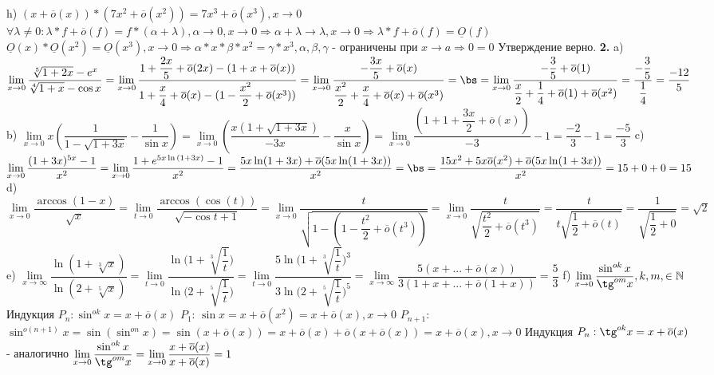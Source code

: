 \documentclass[11pt]{article}
\begin{document}
	h) $(x + \overline{o}(x)) * (7x^2 + \overline{o}(x^2)) = 7x^3 + \overline{o}(x^3), x \to 0$ \sspace
	$\forall \lambda \neq 0: \lambda * f + \overline{o}(f) = f * (\alpha  + \lambda), \alpha \to 0,  x \to 0 \Rightarrow \alpha + \lambda \to \lambda, x \to 0 \Rightarrow \lambda * f + \overline{o}(f) = \underline{O}(f)$ \sspace
	$\underline{O}(x) * \underline{O}(x ^ 2) = \underline{O}(x ^ 3), x \to 0 \Rightarrow \alpha * x  * \beta * x ^ 2 = \gamma * x ^ 3, \alpha, \beta, \gamma$ - ограничены при $x \to a \Rightarrow 0 = 0$ Утверждение верно. \sspace
	\textbf{2.} \sspace
	a) $\lim\limits_{x\to 0} \dfrac{\sqrt[5]{1 + 2x} - e^x}{\sqrt[4]{1 + x} - \cos x} = \lim\limits_{x\to 0} \dfrac{1 + \dfrac{2x}{5} + \overline{o}(2x) - (1  + x + \overline{o}(x))}{1 + \dfrac{x}{4} + \overline{o}(x) - (1 - \dfrac{x^2}{2} + \overline{o}(x ^ 3))} = \lim\limits_{x \to 0} \dfrac{-\dfrac{3x}{5} + \overline{o}(x)}{\dfrac{x^2}{2} + \dfrac{x}{4} + \overline{o}(x) + \overline{o}(x^3)} = \bs = \lim\limits_{x\to 0} \dfrac{-\dfrac{3}{5} + \overline{o}(1)}{\dfrac{x}{2} + \dfrac{1}{4} + \overline{o}(1) + \overline{o}(x^2)} = \dfrac{-\dfrac{3}{5}}{\dfrac{1}{4}} = \dfrac{-12}{5}$ \bs
	b) $\lim\limits_{x\to 0} x(\dfrac{1}{1 - \sqrt{1 + 3x}} - \dfrac{1}{\sin x}) = \lim\limits_{x\to 0} (\dfrac{x(1 + \sqrt{1 + 3x})}{-3x} - \dfrac{x}{\sin x}) = \lim\limits_{x\to 0} \dfrac{(1 + 1  + \dfrac{3x}{2} + \overline{o}(x))}{-3} - 1 = \dfrac{-2}{3} - 1 = \dfrac{-5}{3}$ \sspace
	c) $\lim\limits_{x\to 0} \dfrac{(1 + 3x) ^ {5x} - 1}{x^2} = \lim\limits_{x\to 0} \dfrac{1 + e^{5x\ln{(1 + 3x)}} - 1}{x ^ 2} = \dfrac{5x\ln(1 + 3x)  + \overline{o}(5x\ln(1 + 3x))}{x^2} = \bs = \dfrac{15x^2 + 5x\overline{o}(x^2)  + \overline{o}(5x\ln(1 + 3x))}{x^2} = 15 + 0 + 0 =15$ \sspace
	d)  $\lim\limits_{x\to 0} \dfrac{\arccos {(1 - x)}}{\sqrt{x}} = \lim\limits_{t\to 0} \dfrac{\arccos(\cos(t))}{\sqrt{-\cos t+1}} = \lim\limits_{x\to 0} \dfrac{t}{\sqrt{1 - (1 - \dfrac{t^2}{2} + \overline{o}(t^3))}} = \lim\limits_{x\to 0} \dfrac{t}{\sqrt{\dfrac{t^2}{2} + \overline{o}(t^3)}} = \dfrac{t}{t\sqrt{\dfrac{1}{2} + \overline{o}(t)}} = \dfrac{1}{\sqrt{\dfrac{1}{2} + 0}} = \sqrt{2}$ \sspace
	e) $\lim\limits_{x\to \infty} \dfrac{\ln(1  + \sqrt[3]{x})}{\ln(2 + \sqrt[5]{x})} = \lim\limits_{t \to 0} \dfrac{\ln\bigg(1  + \sqrt[3]{\dfrac{1}{t}}\bigg)}{\ln\bigg(2 + \sqrt[5]{\dfrac{1}{t}}\bigg)} = \lim\limits_{t\to 0} \dfrac{5\ln\bigg(1 + \sqrt[3]{\dfrac{1}{t}}\bigg)^3}{3\ln\bigg(2 + \sqrt[5]{\dfrac{1}{t}}\bigg)^5} = \lim\limits_{x\to \infty} \dfrac{5 (x + ... +  \overline{o}(x))}{3(1 + x + ... + \overline{o}(1 + x))} = \dfrac{5}{3}$ \sspace
	f) $\lim\limits_{x\to 0} \dfrac{\sin^{ok} x}{\tg^{om}x}, k, m, \in \mathbb{N}$ \sspace
	Индукция $P_n: \sin^{ok}x = x + \overline{o}(x)$ \sspace
	$P_1$: $\sin x  = x + \overline{o}(x^2) = x + \overline{o}(x), x \to 0$ \sspace
	$P_{n + 1}$: $\sin^{o(n + 1)}x = \sin(\sin^{on}x) = \sin (x + \overline{o}(x)) = x + \overline{o}(x) + \overline{o}(x + \overline{o}(x)) = x + \overline{o}(x), x \to 0$
	\sspace
	Индукция $P_n: \tg^{ok}x = x + \overline{o}(x)$ - аналогично \sspace
	$\lim\limits_{x\to 0} \dfrac{\sin^{ok} x}{\tg^{om}x} = \lim\limits_{x\to 0} \dfrac{x + \overline{o}(x)}{x + \overline{o}(x)} = 1$
\end{document}
